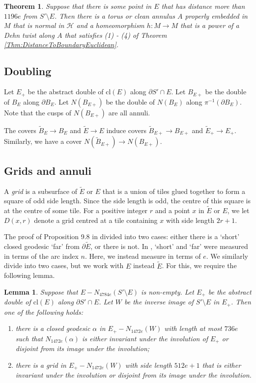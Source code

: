 \documentclass[oneside]{amsart}
\numberwithin{equation}{section}
\theoremstyle{plain}
\newtheorem{theorem}[equation]{Theorem}
\newtheorem{lemma}[equation]{Lemma}
\theoremstyle{definition}
\begin{document}
\begin{theorem}
\label{Thm:ExistsDehnTwist}
Suppose that there is some point in $E$ that has distance more than $1196e$
from $S' \setminus E$. Then there is a torus or clean annulus $A$ properly embedded in $M$ that is normal in $\mathcal{H}$ and a homeomorphism
$h \colon M \rightarrow M$ that is a power of a Dehn twist along $A$ that satisfies (1) - (4) of Theorem \ref{Thm:DistanceToBoundaryEuclidean}.
\end{theorem}

\subsection{Doubling}
Let $E_+$ be the abstract double of $\mathrm{cl}(E)$ along $\partial S' \cap E$. Let $B_{E+}$ be the double of $B_E$ along $\partial B_E$.
Let $N(B_{E+})$ be the double of $N(B_E)$ along $\pi^{-1}(\partial B_E)$. Note that the cusps of $N(B_{E+})$ are all annuli.

The covers $\tilde B_E \rightarrow B_E$ and $\tilde E \rightarrow E$ induce covers $\tilde B_{E+} \rightarrow B_{E+}$ and $\tilde E_+ \rightarrow E_+$. Similarly, we have a cover
$N(\tilde B_{E+}) \rightarrow N(B_{E+})$.

\subsection{Grids and annuli}

A \emph{grid} is a subsurface of $\tilde E$ or $E$ that is a union of tiles glued together
to form a square of odd side length. Since the side length is odd, the centre of this
square is at the centre of some tile. For a positive integer $r$ and a point $x$ in $\tilde E$ or $E$,
we let $D(x,r)$ denote a grid centred at a tile containing $x$ with side length $2r+1$.

The proof of Proposition 9.8 in \cite{Lackenby:PolyUnknot} divided into two cases: either there is a `short' closed geodesic `far' from
$\partial \tilde E$, or there is not. In \cite{Lackenby:PolyUnknot}, `short' and `far' were measured in terms of the arc index $n$. Here,
we instead measure in terms of $e$. We similarly divide into two cases, but 
we work with $E$ instead $\tilde E$. For this, we require the following lemma.

\begin{lemma}
\label{Lem:GeodesicOrGrid}
Suppose that $E - N_{4784e}(S' \setminus E)$ is non-empty. Let $E_+$ be the abstract double of $\mathrm{cl}(E)$ along $\partial S' \cap E$.
Let $W$ be the inverse image of $S' \setminus E$ in $E_+$.
Then one of the following holds:
\begin{enumerate}
\item there is a closed geodesic $\alpha$ in $E_+ - N_{1472e}(W)$ with length at most $736e$ 
such that $N_{1472e}(\alpha)$ is either invariant under the involution of $E_+$ or disjoint from its image
under the involution;
\item there is a grid in $E_+ - N_{1472e}(W)$ with side length $512e+1$
that is either invariant under the involution or disjoint from its image
under the involution.
\end{enumerate}
\end{lemma}
\end{document}
